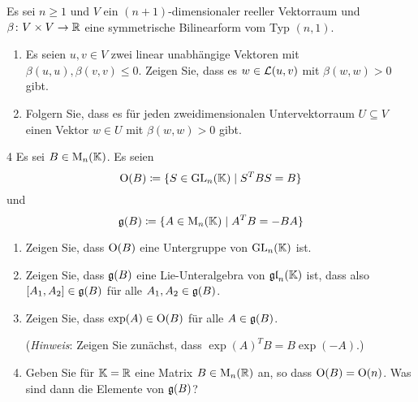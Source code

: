 \begin{question}[subtitle = Existenz raumartiger Vektoren]{3}
  Es sei $n \geq 1$ und $V$ ein $(n+1)$-dimensionaler reeller Vektorraum und $\beta \colon V \times V \to \mathbb{R}$ eine symmetrische Bilinearform vom Typ $(n,1)$.
  \begin{enumerate}[leftmargin=*]
    \item
      Es seien $u, v \in V$ zwei linear unabhängige Vektoren mit $\beta(u,u), \beta(v,v) \leq 0$.
      Zeigen Sie, dass es $w \in \operatorname{\mathcal{L}}(u,v)$ mit $\beta(w, w) > 0$ gibt.
    \item
      Folgern Sie, dass es für jeden zweidimensionalen Untervektorraum $U \subseteq V$ einen Vektor $w \in U$ mit $\beta(w,w) > 0$ gibt.
  \end{enumerate}
\end{question}







\begin{question}[subtitle = Isometriegruppe und Lie-Algebra einer Bilinearform in Koordinaten]{4}
  \label{qst: isometry group and lie algebra of bilinear form coordinate ver}
  Es sei $B \in \operatorname{M}_n(\mathbb{K})$.
  Es seien
  \[
              \operatorname{O}(B)
    \coloneqq \{ S \in \operatorname{GL}_n(\mathbb{K}) \mid S^T B S = B \}
  \]
  und
  \[          \mathfrak{g}(B)
    \coloneqq \{ A \in \operatorname{M}_n(\mathbb{K}) \mid A^T B = - B A \}
  \]
  \begin{enumerate}[leftmargin=*]
    \item
      Zeigen Sie, dass $\operatorname{O}(B)$ eine Untergruppe von $\operatorname{GL}_n(\mathbb{K})$ ist.
    \item
      Zeigen Sie, dass $\mathfrak{g}(B)$ eine Lie-Unteralgebra von $\mathfrak{gl}_n(\mathbb{K})$ ist, dass also $[A_1, A_2] \in \mathfrak{g}(B)$ für alle $A_1, A_2 \in \mathfrak{g}(B)$.
    \item
      Zeigen Sie, dass $\exp(A) \in \operatorname{O}(B)$ für alle $A \in \mathfrak{g}(B)$.
      
      (\emph{Hinweis}:
       Zeigen Sie zunächst, dass $\exp(A)^T B = B \exp(-A)$.)
    \item
      Geben Sie für $\mathbb{K} = \mathbb{R}$ eine Matrix $B \in \operatorname{M}_n(\mathbb{R})$ an, so dass $\operatorname{O}(B) = \operatorname{O}(n)$.
      Was sind dann die Elemente von $\mathfrak{g}(B)$?
  \end{enumerate}
\end{question}


